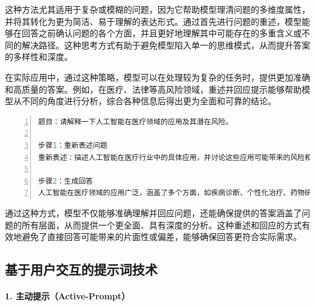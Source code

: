 这种方法尤其适用于复杂或模糊的问题，因为它帮助模型理清问题的多维度属性，并将其转化为更为简洁、易于理解的表达形式。通过首先进行问题的重述，模型能够在回答之前确认问题的各个方面，并且更好地理解其中可能存在的多重含义或不同的解决路径。这种思考方式有助于避免模型陷入单一的思维模式，从而提升答案的多样性和深度。

在实际应用中，通过这种策略，模型可以在处理较为复杂的任务时，提供更加准确和高质量的答案。例如，在医疗、法律等高风险领域，重述并回应提示能够帮助模型从不同的角度进行分析，综合各种信息后得出更为全面和可靠的结论。

\begin{lstlisting}[language={python},label={},caption={}, basicstyle=\footnotesize\ttfamily, breaklines=true, numbers=left, frame=single]
题目：请解释一下人工智能在医疗领域的应用及其潜在风险。

步骤1：重新表述问题
重新表述：描述人工智能在医疗行业中的具体应用，并讨论这些应用可能带来的风险和挑战。

步骤2：生成回答
人工智能在医疗领域的应用广泛，涵盖了多个方面，如疾病诊断、个性化治疗、药物研发和医疗影像分析等。AI技术能够通过分析大量数据，提高诊断的准确性、帮助医生制定个性化治疗方案，并加速药物研发过程。同时，AI在医疗影像分析中的应用，使得医生能够更高效地识别影像中的病变，提高了早期发现疾病的可能性。然而，这些技术的应用也带来了一些潜在风险。首先，数据隐私问题成为了一个重要的关注点，AI系统通常需要处理大量的个人健康数据，如何确保这些数据的安全和隐私是一个亟待解决的问题。其次，算法的偏见问题可能导致医疗决策的不公正，特别是在样本数据不充分或偏差的情况下。此外，AI的普及可能对医疗专业人员的角色产生影响，尽管AI能够提高效率，但医生的决策能力和临床经验依然是至关重要的。总之，在推广AI医疗应用时，必须谨慎处理上述风险，确保技术的安全性、公平性和可接受性。
\end{lstlisting}

通过这种方式，模型不仅能够准确理解并回应问题，还能确保提供的答案涵盖了问题的所有层面，从而提供一个更全面、具有深度的分析。这种重述和回应的方式有效地避免了直接回答可能带来的片面性或偏差，能够确保回答更符合实际需求。

\subsection{基于用户交互的提示词技术}

\paragraph{1. 主动提示（Active-Prompt）} 

